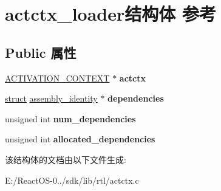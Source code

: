 \hypertarget{structactctx__loader}{}\section{actctx\+\_\+loader结构体 参考}
\label{structactctx__loader}
\subsection*{Public 属性}
\begin{DoxyCompactItemize}
\item 
\mbox{\label{structactctx__loader_ae6f2d2f4e516bafc5a94363f75fc203d}} 
\hyperlink{struct___a_c_t_i_v_a_t_i_o_n___c_o_n_t_e_x_t}{A\+C\+T\+I\+V\+A\+T\+I\+O\+N\+\_\+\+C\+O\+N\+T\+E\+XT} $\ast$ {\bfseries actctx}
\item 
\mbox{\label{structactctx__loader_a096efb79d5587da2e6aacfbac4efe9fc}} 
\hyperlink{interfacestruct}{struct} \hyperlink{structassembly__identity}{assembly\+\_\+identity} $\ast$ {\bfseries dependencies}
\item 
\mbox{\label{structactctx__loader_a13dd51ffae8d9a0acc8da9d41bc0cfbe}} 
unsigned int {\bfseries num\+\_\+dependencies}
\item 
\mbox{\label{structactctx__loader_a053e59e88e9b76376cd520468792ca6d}} 
unsigned int {\bfseries allocated\+\_\+dependencies}
\end{DoxyCompactItemize}


该结构体的文档由以下文件生成\+:\begin{DoxyCompactItemize}
\item 
E\+:/\+React\+O\+S-\/0../sdk/lib/rtl/actctx.\+c\end{DoxyCompactItemize}
